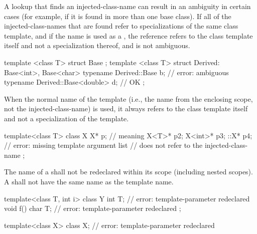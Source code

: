 \pnum
A lookup that finds an injected-class-name can result in an ambiguity in
certain cases (for example, if it is found in more than one
base class).
If all of the injected-class-names that are
found refer to specializations of the same class template,
and if the name
is used as a ,
the reference refers to the class template itself and not a
specialization thereof, and is not ambiguous.
\begin{example}
\begin{codeblock}
template <class T> struct Base { };
template <class T> struct Derived: Base<int>, Base<char> {
  typename Derived::Base b;             // error: ambiguous
  typename Derived::Base<double> d;     // OK
};
\end{codeblock}
\end{example}

\pnum
When the normal name of the template (i.e., the name from
the enclosing scope, not the injected-class-name) is
used,
it always refers to the class template itself and not a
specialization of the template.
\begin{example}
\begin{codeblock}
template<class T> class X {
  X* p;                                 // meaning 
  X<T>* p2;
  X<int>* p3;
  ::X* p4;                              // error: missing template argument list
                                        //  does not refer to the injected-class-name
};
\end{codeblock}
\end{example}

\pnum
The name of a
shall not be redeclared within its scope (including nested scopes).
A
shall not have the same name as the template name.
\begin{example}
\begin{codeblock}
template<class T, int i> class Y {
  int T;                                // error: template-parameter redeclared
  void f() {
    char T;                             // error: template-parameter redeclared
  }
};

template<class X> class X;              // error: template-parameter redeclared
\end{codeblock}
\end{example}

